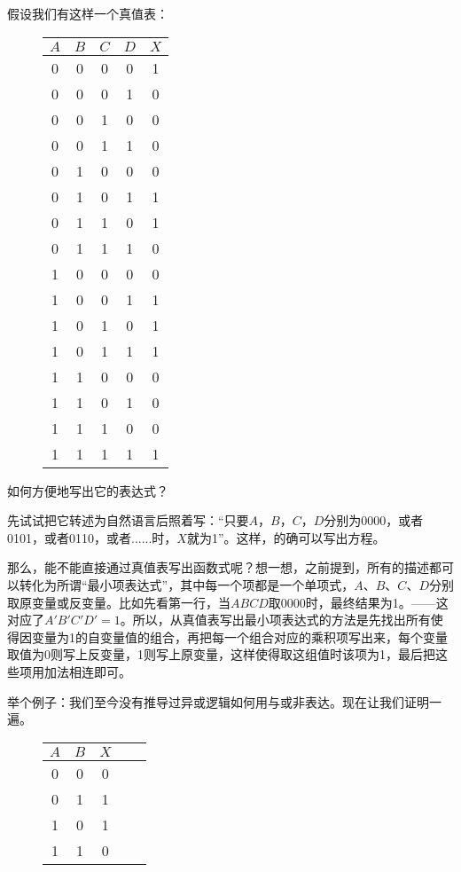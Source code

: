 \documentclass[UTF8]{ctexart}
\begin{document}
假设我们有这样一个真值表：
\begin{figure}
    \begin{tabular}{|c|c|c|c|c|}\hline\rowcolor{lightgray}
        $A$ & $B$ & $C$ & $D$ & $X$ \\\hline
        0&0&0&0&1\\\hline
        0&0&0&1&0\\\hline
        0&0&1&0&0\\\hline
        0&0&1&1&0\\\hline
        0&1&0&0&0\\\hline
        0&1&0&1&1\\\hline
        0&1&1&0&1\\\hline
        0&1&1&1&0\\\hline
        1&0&0&0&0\\\hline
        1&0&0&1&1\\\hline
        1&0&1&0&1\\\hline
        1&0&1&1&1\\\hline
        1&1&0&0&0\\\hline
        1&1&0&1&0\\\hline
        1&1&1&0&0\\\hline
        1&1&1&1&1\\\hline
    \end{tabular}
\end{figure}

如何方便地写出它的表达式？

先试试把它转述为自然语言后照着写：“只要$A$，$B$，$C$，$D$分别为0000，或者0101，或者0110，或者......时，$X$就为1”。这样，的确可以写出方程。

那么，能不能直接通过真值表写出函数式呢？想一想，之前提到，所有的描述都可以转化为所谓“最小项表达式”，其中每一个项都是一个单项式，$A$、$B$、$C$、$D$分别取原变量或反变量。比如先看第一行，当$ABCD$取0000时，最终结果为1。——这对应了$A'B'C'D'=1$。所以，从真值表写出最小项表达式的方法是先找出所有使得因变量为1的自变量值的组合，再把每一个组合对应的乘积项写出来，每个变量取值为0则写上反变量，1则写上原变量，这样使得取这组值时该项为1，最后把这些项用加法相连即可。

举个例子：我们至今没有推导过异或逻辑如何用与或非表达。现在让我们证明一遍。

\begin{figure}
    \begin{tabular}{|c|c|c|c|c|}\hline\rowcolor{lightgray}
        $A$ & $B$ & $X$ \\\hline
        0&0&0\\\hline
        0&1&1\\\hline
        1&0&1\\\hline
        1&1&0\\\hline
    \end{tabular}
\end{figure}
\end{document}

